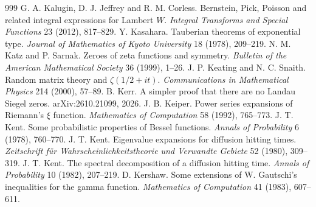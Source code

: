 \begin{thebibliography}{999}
 G. A. Kalugin, D. J. Jeffrey and R. M. Corless. Bernstein, Pick, Poisson and related integral expressions for Lambert $W$. \emph{Integral Transforms and Special Functions} 23 (2012), 817--829.
 Y. Kasahara. Tauberian theorems of exponential type. \emph{Journal of Mathematics of Kyoto University} 18 (1978), 209--219.
 N. M. Katz and P. Sarnak. Zeroes of zeta functions and symmetry. \emph{Bulletin of the American Mathematical Society} 36 (1999), 1--26.
 J. P. Keating and N. C. Snaith. Random matrix theory and $\zeta(1/2+it)$. \emph{Communications in Mathematical Physics} 214 (2000), 57--89.
 B. Kerr. A simpler proof that there are no Landau Siegel zeros. arXiv:2610.21099, 2026.
 J. B. Keiper. Power series expansions of Riemann's $\xi$ function. \emph{Mathematics of Computation} 58 (1992), 765--773.
 J. T. Kent. Some probabilistic properties of Bessel functions. \emph{Annals of Probability} 6 (1978), 760--770.
 J. T. Kent. Eigenvalue expansions for diffusion hitting times. \emph{Zeitschrift f\"ur Wahrscheinlichkeitstheorie und Verwandte Gebiete} 52 (1980), 309--319.
 J. T. Kent. The spectral decomposition of a diffusion hitting time. \emph{Annals of Probability} 10 (1982), 207--219.
 D. Kershaw. Some extensions of W. Gautschi's inequalities for the gamma function. \emph{Mathematics of Computation} 41 (1983), 607--611.

\end{thebibliography}
